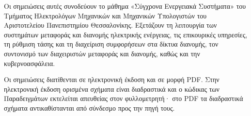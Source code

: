 Οι σημειώσεις αυτές συνοδεύουν το μάθημα «Σύγχρονα Ενεργειακά Συστήματα» του Τμήματος
Ηλεκτρολόγων Μηχανικών και Μηχανικών Υπολογιστών του Αριστοτελείου Πανεπιστημίου
Θεσσαλονίκης. Εξετάζουν τη λειτουργία των συστημάτων μεταφοράς και διανομής ηλεκτρικής
ενέργειας, τις επικουρικές υπηρεσίες, τη ρύθμιση τάσης και τη διαχείριση συμφορήσεων στα δίκτυα
διανομής, τον συντονισμό των διαχειριστών μεταφοράς και διανομής, καθώς και την
κυβερνοασφάλεια.

Οι σημειώσεις διατίθενται σε ηλεκτρονική έκδοση και σε μορφή PDF. Στην ηλεκτρονική έκδοση
ορισμένα σχήματα είναι διαδραστικά και ο κώδικας των Παραδειγμάτων εκτελείται απευθείας στον
φυλλομετρητή· στο PDF τα διαδραστικά σχήματα αντικαθίστανται από σύνδεσμο προς την πηγή τους.
